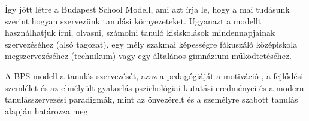 




Így jött létre a Budapest School Modell, ami azt írja le, hogy a mai
tudásunk szerint hogyan szervezünk tanulási környezeteket. Ugyanazt a
modellt használhatjuk írni, olvasni, számolni tanuló kisiskolások
mindennapjainak szervezéséhez (alsó tagozat), egy mély szakmai
képességre fókuszáló középiskola megszervezéséhez (technikum) vagy egy
általános\break
gimnázium működtetéséhez.

A BPS modell a tanulás szervezését, azaz a pedagógiáját a motiváció
{\autocite{Pink2011}}, a fejlődési szemlélet {\autocite{Dweck2006}} és
az elmélyült gyakorlás {\autocite{Ericsson2016}} pszichológiai kutatási
eredményei és a modern tanulásszervezési paradigmák, mint az önvezérelt
{\autocite{Mitra2012}} és a személyre szabott {\autocite{Khan2012}}
tanulás alapján határozza meg.

